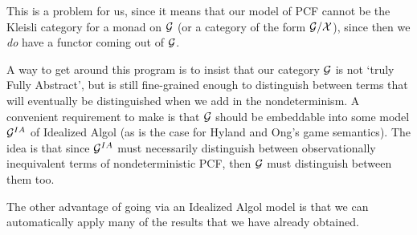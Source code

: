 This is a problem for us, since it means that our model of PCF cannot be the Kleisli category for a monad on $\mathcal G$ (or a category of the form $\mathcal G/\mathcal X$), since then we \emph{do} have a functor coming out of $\mathcal G$.

A way to get around this program is to insist that our category $\mathcal G$ is not `truly Fully Abstract', but is still fine-grained enough to distinguish between terms that will eventually be distinguished when we add in the nondeterminism.  
A convenient requirement to make is that $\mathcal G$ should be embeddable into some model $\mathcal G^{IA}$ of Idealized Algol (as is the case for Hyland and Ong's game semantics).  
The idea is that since $\mathcal G^{IA}$ must necessarily distinguish between observationally inequivalent terms of nondeterministic PCF, then $\mathcal G$ must distinguish between them too.

The other advantage of going via an Idealized Algol model is that we can automatically apply many of the results that we have already obtained.

